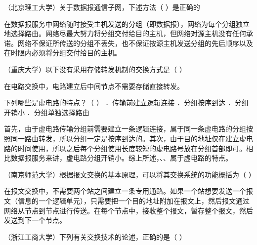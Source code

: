 \question （北京理工大学）关于数据报通信子网，下述方法（ ）是正确的
\par{}
\begin{solution}在数据报服务中网络随时接受主机发送的分组（即数据报），网络为每个分组独立地选择路由。网络尽最大努力将分组交付给目的主机，但网络对源主机没有任何承诺。网络不保证所传送的分组不丢失，也不保证按源主机发送分组的先后顺序以及在时限内必须将分组交付给目的主机。
\end{solution}
\question （重庆大学）以下没有采用存储转发机制的交换方式是（ ）
\par{}
\begin{solution}在电路交换中，电路建立后中间节点不需要存储直接转发。
\end{solution}
\question 下列哪些是虚电路的特点？（ ） ．传输前建立逻辑连接 ．分组按序到达
．分组开销小 ．分组单独选择路由
\par{}
\begin{solution}首先，由于虚电路传输分组前需要建立一条逻辑连接，属于同一条虚电路的分组按照同一路由转发，所以分组一定是按序到达的。其次，由于目的地址仅在建立虚电路的时间使用，所以之后每个分组使用长度较短的虚电路号放在分组首部即可。相比数据报服务来讲，虚电路分组开销小。综上所述，、、属于虚电路的特点。
\end{solution}
\question （南京师范大学）根据报文交换的基本原理，可以将其交换系统的功能概括为（
）
\par{}
\begin{solution}在报文交换中，不需要两个站之间建立一条专用通路。如果一个站想要发送一个报文（信息的一个逻辑单元），只需要把一个目的地址附加在报文上，然后报文通过网络从节点到节点进行传送。在每个节点中，接收整个报文，暂存整个报文，然后发送到下一个节点。
\end{solution}
\question （浙江工商大学）下列有关交换技术的论述，正确的是（ ）
\par{}
